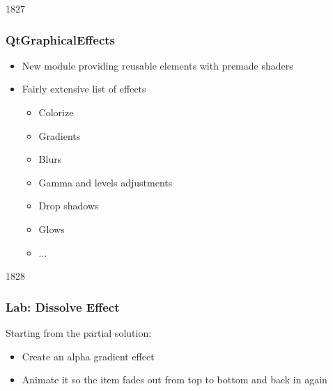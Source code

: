 \begin{slide}{1827}\frametitle{QtGraphicalEffects}

\begin{itemize}
\item New module providing reusable elements with premade shaders
\item Fairly extensive list of effects
  \begin{itemize}
  \item Colorize
  \item Gradients
  \item Blurs
  \item Gamma and levels adjustments
  \item Drop shadows
  \item Glows
  \item ...
  \end{itemize}
\end{itemize}

\end{slide}


\begin{slide}{1828}\frametitle{Lab: Dissolve Effect}

Starting from the partial solution:

\begin{itemize}
\item Create an alpha gradient effect
\item Animate it so the item fades out from top to bottom and back in again
\end{itemize}

\end{slide}

